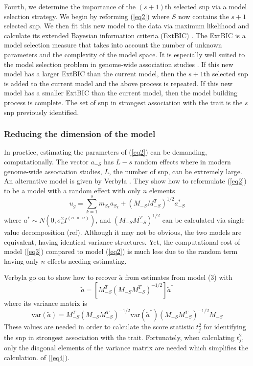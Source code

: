 \documentclass{nature}
\begin{document}
Fourth, we determine the importance of the $(s+1)$th selected snp via a model selection strategy. 
We begin by reforming (\ref{eq2}) where $S$ now contains the $s + 1$ selected snp.  We then fit this new model to the data
via maximum likelihood and calculate its extended Bayesian information criteria (ExtBIC) \cite{chen2008extended}.  The ExtBIC is a model selection measure that takes into account the number of unknown parameters and the complexity 
of the model space.  It is especially well suited to the model selection problem in genome-wide association studies \cite{chen2008extended}. If this new model has a larger ExtBIC than the current model, then the $s+1$th selected snp is added to 
the current model and the above process is repeated. If this new model has a smaller ExtBIC than the current model, then the 
model building process is complete. The set of snp in strongest association with the trait is the $s$ snp previously identified. 

\subsubsection{Reducing the dimension of the model}
In practice, estimating the parameters of (\ref{eq2}) can be demanding, computationally. 
The vector $a_{-S}$ has $L-s$ random effects where in modern genome-wide association studies, 
$L$, the number of snp, can be extremely large.  An alternative model is given by 
Verbyla \cite{verbyla2012rwgaim,verbyla2014whole}. 
They show how to reformulate (\ref{eq2}) to be a model with a random effect with only $n$ elements
\begin{equation}
\label{eq3}
u_g = \sum_{k=1}^s  m_{S_k} a_{S_k} + (M_{-S} M_{-S}^T)^{1/2} a^*_{-S}
\end{equation}
where $a^* \sim N(0, \sigma_a^2 I^{(n \; \times \;  n)})$, and 
$(M_{-S} M_{-S}^T)^{1/2}$ can be calculated via single value decomposition (ref).  
Although it may not be obvious, the two models are equivalent, 
having identical variance structures. Yet, the computational cost of model (\ref{eq3}) compared to 
model (\ref{eq2}) is much less due to the random term having only $n$ effects needing estimating. 

Verbyla \cite{verbyla2012rwgaim,verbyla2014whole} go on to show how to recover $\widetilde{a}$ from estimates from model (3) with 
\begin{equation}
\widetilde{a} = \left [ M_{-S}^T (M_{-S} M_{-S}^T)^{-1/2} \right ] \widetilde{a}^*
\end{equation}
where its variance matrix is
\begin{equation}
\label{eq4}
\textrm{var}(\widetilde{a}) = M_{-S}^T (M_{-S} M_{-S}^T)^{-1/2} \textrm{var}(\widetilde{a}^*) (M_{-S} M_{-S}^T)^{-1/2} M_{-S}
\end{equation}
These values are needed in order to calculate the score statistic $t_j^2$ for identifying the snp in strongest association with the trait. 
Fortunately, when calculating $t_j^2$, only the diagonal elements of the variance matrix are needed which simplifies the  calculation. 
of (\ref{eq4}). 
\end{document}
